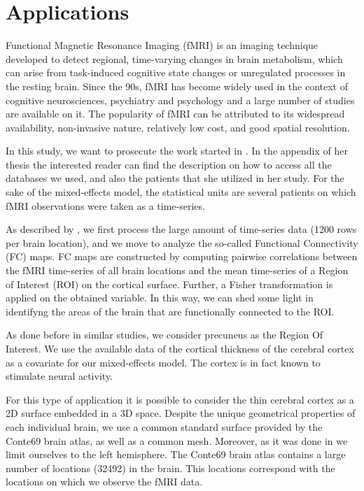 \chapter{Applications} \label{ch:Applications}

Functional Magnetic Resonance Imaging (fMRI) is an imaging technique developed
to detect regional, time-varying changes in brain metabolism, which can arise
from task-induced cognitive state changes or unregulated processes in the
resting brain. Since the 90s, fMRI has become widely used in the context of
cognitive neurosciences, psychiatry and psychology and a large number of
studies are available on it. The popularity of fMRI can be attributed to its
widespread availability, non-invasive nature, relatively low cost, and good
spatial resolution.

In this study, we want to prosecute the work started in \cite{kim}. In the
appendix of her thesis the interested reader can find the description on how to
access all the databases we used, and also the patients that she utilized in
her study.  For the sake of the mixed-effects model, the statistical units are
several patients on which fMRI observations were taken as a time-series.

As described by \citeauthor{kim}, we first process the large amount of
time-series data (1200 rows per brain location), and we move to analyze the
so-called Functional Connectivity (FC) maps. FC maps are constructed by
computing pairwise correlations between the fMRI time-series of all brain
locations and the mean time-series of a Region of Interest (ROI) on the
cortical surface.  Further, a Fisher transformation is applied on the obtained
variable. In this way, we can shed some light in identifyng the areas of the
brain that are functionally connected to the ROI. 

As done before in similar studies, we consider precuneus as the Region Of
Interest.  We use the available data of the cortical thickness of the cerebral
cortex as a covariate for our mixed-effects model.  The cortex is in fact known
to stimulate neural activity.

For this type of application it is possible to consider the thin cerebral
cortex as a 2D surface embedded in a 3D space.  Despite the unique geometrical
properties of each individual brain, we use a common standard surface provided
by the Conte69 brain atlas, as well as a common mesh.  Moreover, as it was done
in \cite{kim} we limit ourselves to the left hemisphere.  The Conte69 brain
atlas contains a large number of locations (32492) in the brain. This locations
correspond with the locations on which we observe the fMRI data.

